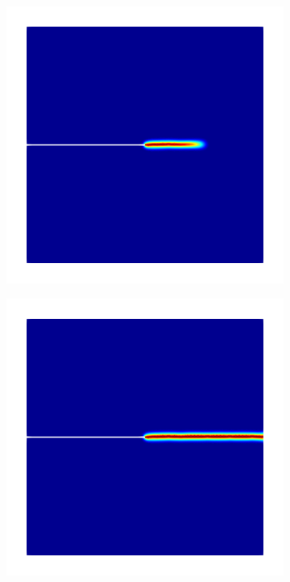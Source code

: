 \begin{figure}[htb!]
\begin{subfigure}[b]{0.21\textwidth}
    \caption{}
    \label{fig: Chapter4/mode1_notched_plate_damage_1}
  \end{subfigure}
  \begin{subfigure}[b]{0.21\textwidth}
    \centering
    \includegraphics[width=\textwidth,scale=0.5]{Chapter4/figures/mode1_notched_plate_intermediate.png}
    \caption{}
    \label{fig: Chapter4/mode1_notched_plate_damage_2}
  \end{subfigure}
  \begin{subfigure}[b]{0.21\textwidth}
    \centering
    \includegraphics[width=\textwidth,scale=0.5]{Chapter4/figures/mode1_notched_plate_final.png}

\end{subfigure}
\end{figure}
